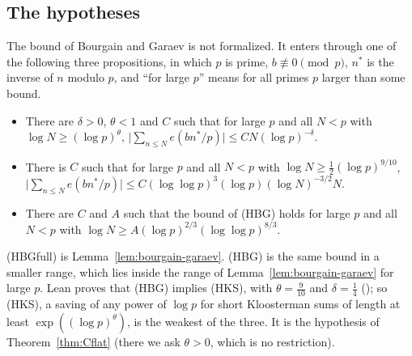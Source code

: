 \subsection*{The hypotheses}
The bound of Bourgain and Garaev is not formalized. It enters through one of the following three propositions, in which $p$ is prime, $b\not\equiv0\pmod p$, $n^*$ is the inverse of $n$ modulo $p$, and ``for large $p$'' means for all primes $p$ larger than some bound.
\begin{itemize}[leftmargin=5.6em,labelwidth=5.2em,labelsep=0.4em,align=left]
\item[(HKS)] There are $\delta>0$, $\theta<1$ and $C$ such that for large $p$ and all $N<p$ with $\log N\ge(\log p)^\theta$,
$\bigl|\sum_{n\le N}e(bn^*/p)\bigr|\le CN(\log p)^{-\delta}$.
\item[(HBG)] There is $C$ such that for large $p$ and all $N<p$ with $\log N\ge\frac12(\log p)^{9/10}$,
$\bigl|\sum_{n\le N}e(bn^*/p)\bigr|\le C(\log\log p)^3(\log p)(\log N)^{-3/2}N$.
\item[(HBGfull)] There are $C$ and $A$ such that the bound of (HBG) holds for large $p$ and all $N<p$ with $\log N\ge A(\log p)^{2/3}(\log\log p)^{8/3}$.
\end{itemize}
(HBGfull) is Lemma~\ref{lem:bourgain-garaev}. (HBG) is the same bound in a smaller range, which lies inside the range of Lemma~\ref{lem:bourgain-garaev} for large $p$. Lean proves that (HBG) implies (HKS), with $\theta=\frac9{10}$ and $\delta=\frac14$ (); so (HKS), a saving of any power of $\log p$ for short Kloosterman sums of length at least $\exp((\log p)^\theta)$, is the weakest of the three. It is the hypothesis of Theorem~\ref{thm:Cflat} (there we ask $\theta>0$, which is no restriction).


